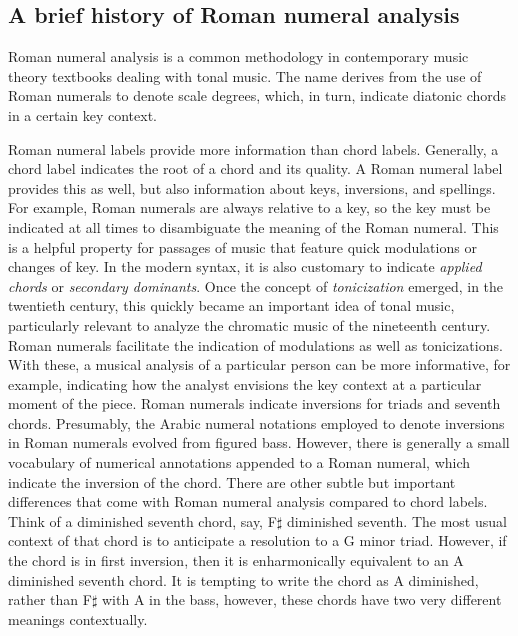 \subsection{A brief history of Roman numeral analysis}
\label{sec:a_brief_history_of_roman_numeral_analysis}

Roman numeral analysis is a common methodology in contemporary music theory textbooks dealing with tonal music.
The name derives from the use of Roman numerals to denote scale degrees, which, in turn, indicate diatonic chords in a certain key context.

Roman numeral labels provide more information than chord labels.
Generally, a chord label indicates the root of a chord and its quality.
A Roman numeral label provides this as well, but also information about keys, inversions, and spellings.
For example, Roman numerals are always relative to a key, so the key must be indicated at all times to disambiguate the meaning of the Roman numeral.
This is a helpful property for passages of music that feature quick modulations or changes of key.
In the modern syntax, it is also customary to indicate \emph{applied chords} or \emph{secondary dominants}.
Once the concept of \emph{tonicization} emerged, in the twentieth century, this quickly became an important idea of tonal music, particularly relevant to analyze the chromatic music of the nineteenth century.
Roman numerals facilitate the indication of modulations as well as tonicizations.
With these, a musical analysis of a particular person can be more informative, for example, indicating how the analyst envisions the key context at a particular moment of the piece.
Roman numerals indicate inversions for triads and seventh chords.
Presumably, the Arabic numeral notations employed to denote inversions in Roman numerals evolved from figured bass.
However, there is generally a small vocabulary of numerical annotations appended to a Roman numeral, which indicate the inversion of the chord.
There are other subtle but important differences that come with Roman numeral analysis compared to chord labels.
Think of a diminished seventh chord, say, F$\sharp$ diminished seventh.
The most usual context of that chord is to anticipate a resolution to a G minor triad.
However, if the chord is in first inversion, then it is enharmonically equivalent to an A diminished seventh chord.
It is tempting to write the chord as A diminished, rather than F$\sharp$ with A in the bass, however, these chords have two very different meanings contextually.
